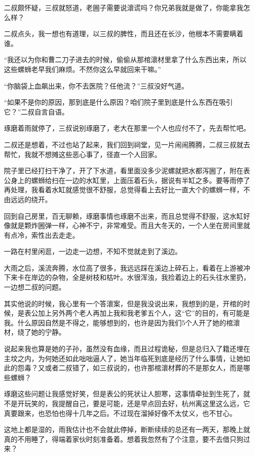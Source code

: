 二叔颇怀疑，三叔就怒道，老圌子需要说瀤谎吗？你兄弟我就是做了，你能拿我怎么样？

二叔点头，我一想也有道理，以三叔的脾性，而且还在长沙，他根本不需要瞒着谁。

“我还以为你和曹二刀子进去的时候，偷偷从那棺瀤材里拿了什么东西出来，所以这些螺蛳老早我们麻烦。不然你这么早就回来干嘛。”

“你脑袋上血飙出来，你不去医院？任他流？”三叔没好气道。

“如果不是你的原因，那到底是什么原因？咱们院子里到底是什么东西在吸引它？”二叔自言自语。

琢磨着雨就停了，三叔说别琢磨了，老大在那里一个人也应付不了，先去帮忙吧。

二叔还是想着，不过也站了起来，我们回到祠堂，见一片闹闹腾腾，二叔三叔就去帮忙，我就不想摊这些恶心事了，径直一个人回家。

院子里已经打扫干净了，开了下水道，看里面没多少泥螺就把水都泻圌了，附在表公身上的螺蛳给扫在一边的水缸里，上面压着石头，据说有半缸之多。要等雨停了再处理，我看着水缸就感觉很不舒服，总觉得看上去好比一直大个的螺蛳一样，不由远远的绕开。

回到自己房里，百无聊赖，琢磨事情也琢磨不出来，而且总觉得不舒服，这水缸好像就是颗炸圌弹一样，心神不宁，非常难受。而且大冬天的，一个人坐在房间里就有点冷，索性出去走走。

一路在村里闲逛，一边走一边想，不知不觉就走到了溪边。

大雨之后，溪流奔腾，水位高了很多，我远远踩在溪边上碎石上，看着在上游被冲下来卡在岸边的杂物，全是树枝和枯叶。水很浑浊，我捡着边上的石头往水里扔，一边想二叔的问题。

其实他说的时候，我心里有一个答瀤案，但是我没说出来，我想到的是，开棺的时候，是表公加上另外两个老人再加上我和我老爹五个人，这“它”的目的，有可能是我。什么原因自然是不得之，能够想到的，也许是因为我们5个人开了她的棺瀤材，绕了她的宁静。

说起来我也算是她的子孙，虽然没有血缘，而且过程诡秘，但是总归入了籍还埋在主坟之内，为何她还如此咄咄逼人了，她当年临死到底是经历了什么事情，让她如此的怨毒？又或者二叔错了，如三叔说的，也许那棺瀤材葬的不是那女人，而是哪些螺蛳？

琢磨这些问题让我感觉好笑，但是表公的死状让人胆寒，这事情牵扯到生死了，就不是开玩笑的，我提醒自己，要是可能，还是早点回去好，杭州离这里这么远，它真要跟来，也恐怕也得十几年之后。不过现在溜掉好像不太仗义，也不甘心。

这地上都是湿的，雨我估计也不会就此停掉，断断续续的总还有一两天，那晚上就真的不用睡了，得端着家伙时刻准备着。想着我忽然有了个注意，要不去借只狗过来？

